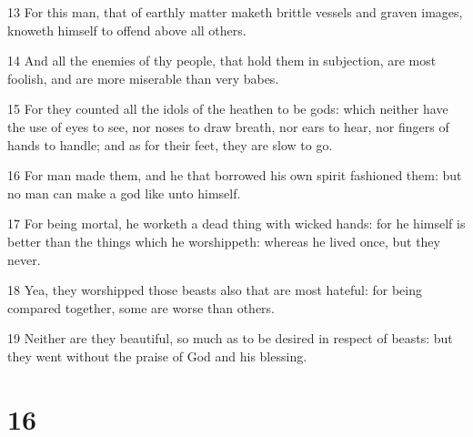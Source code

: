\par 13 For this man, that of earthly matter maketh brittle vessels and graven images, knoweth himself to offend above all others.
\par 14 And all the enemies of thy people, that hold them in subjection, are most foolish, and are more miserable than very babes.
\par 15 For they counted all the idols of the heathen to be gods: which neither have the use of eyes to see, nor noses to draw breath, nor ears to hear, nor fingers of hands to handle; and as for their feet, they are slow to go.
\par 16 For man made them, and he that borrowed his own spirit fashioned them: but no man can make a god like unto himself.
\par 17 For being mortal, he worketh a dead thing with wicked hands: for he himself is better than the things which he worshippeth: whereas he lived once, but they never.
\par 18 Yea, they worshipped those beasts also that are most hateful: for being compared together, some are worse than others.
\par 19 Neither are they beautiful, so much as to be desired in respect of beasts: but they went without the praise of God and his blessing.

\chapter{16}

